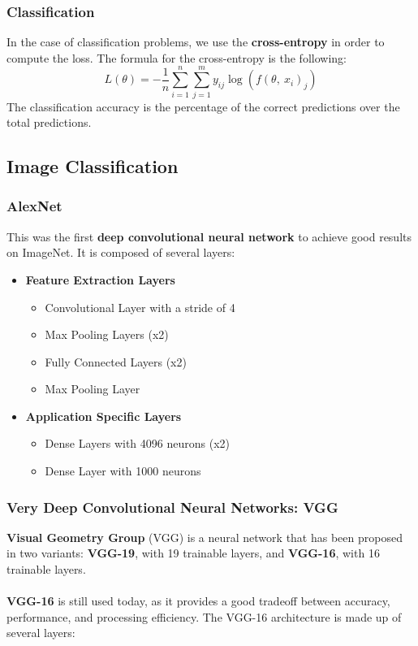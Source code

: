 \documentclass{article}
\begin{document}
\subsubsection{Classification}
In the case of classification problems, we use the \textbf{cross-entropy} in order to compute the loss. The formula for the cross-entropy is the following:
\[ L(\theta) = \displaystyle -\frac{1}{n} \sum^n_{i=1}\sum^m_{j=1} y_{ij}\log(f(\theta,~x_i)_j) \]
The classification accuracy is the percentage of the correct predictions over the total predictions.

\subsection{Image Classification}
\subsubsection{AlexNet}
This was the first \textbf{deep convolutional neural network} to achieve good results on ImageNet. It is composed of several layers:

\begin{itemize}
	\item \textbf{Feature Extraction Layers}
	\begin{itemize}
		\item Convolutional Layer with a stride of 4
		\item Max Pooling Layers (x2)
		\item Fully Connected Layers (x2)
		\item Max Pooling Layer
	\end{itemize}
	
	\item \textbf{Application Specific Layers}
	\begin{itemize}
		\item Dense Layers with 4096 neurons (x2)
		\item Dense Layer with 1000 neurons
	\end{itemize}
\end{itemize}

\subsubsection{Very Deep Convolutional Neural Networks: VGG}
\textbf{Visual Geometry Group} (VGG) is a neural network that has been proposed in two variants: \textbf{VGG-19}, with 19 trainable layers, and \textbf{VGG-16}, with 16 trainable layers. \\ \\
\textbf{VGG-16} is still used today, as it provides a good tradeoff between accuracy, performance, and processing efficiency. The VGG-16 architecture is made up of several layers:
\end{document}
